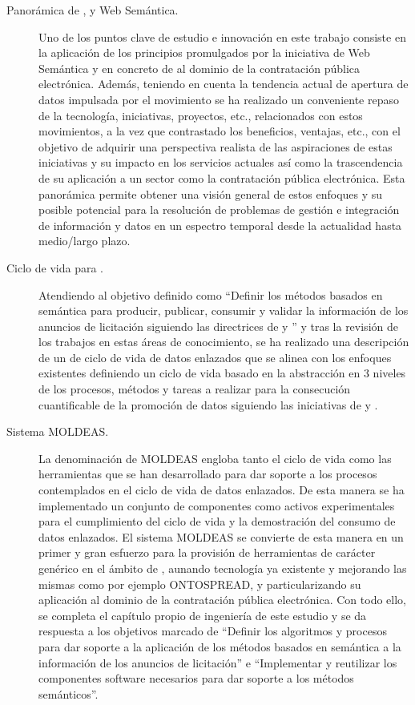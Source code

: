 \begin{description}
\item [Panorámica de \opendata, \linkeddata y Web Semántica.] Uno de los puntos clave de estudio e innovación en este trabajo 
consiste en la aplicación de los principios promulgados por la iniciativa de Web Semántica y en concreto de \linkeddata al 
dominio de la contratación pública electrónica. Además, teniendo en cuenta la tendencia actual de apertura de datos 
impulsada por el movimiento \opendata se ha realizado un conveniente repaso de la tecnología, iniciativas, proyectos, etc., 
relacionados con estos movimientos, a la vez que contrastado los beneficios, ventajas, etc., con el objetivo 
de adquirir una perspectiva realista de las aspiraciones de estas iniciativas y su impacto en los servicios actuales así 
como la trascendencia de su aplicación a un sector como la contratación pública electrónica. Esta panorámica permite 
obtener una visión general de estos enfoques y su posible potencial para la resolución de problemas de gestión e integración 
de información y datos en un espectro temporal desde la actualidad hasta medio/largo plazo.

\item [Ciclo de vida para \linkeddata.] Atendiendo al objetivo definido como ``Definir los métodos basados en semántica para producir, publicar, consumir y validar 
la información de los anuncios de licitación siguiendo las directrices de \opendata y \linkeddata'' y tras la revisión de los trabajos 
en estas áreas de conocimiento, se ha realizado una descripción de un de ciclo de vida de datos enlazados que se alinea con los enfoques 
existentes definiendo un ciclo de vida basado en la abstracción en 3 niveles de los procesos, métodos y tareas a realizar 
para la consecución cuantificable de la promoción de datos siguiendo las iniciativas de \linkeddata y \opendata.

\item [Sistema MOLDEAS.] La denominación de \gls{MOLDEAS} engloba tanto el ciclo de vida como las herramientas que se han desarrollado 
para dar soporte a los procesos contemplados en el ciclo de vida de datos enlazados. De esta manera se ha implementado un conjunto 
de componentes como activos experimentales para el cumplimiento del ciclo de vida y la demostración del consumo de datos enlazados. El 
sistema MOLDEAS se convierte de esta manera en un primer y gran esfuerzo para la provisión de herramientas de carácter genérico 
en el ámbito de \linkeddata, aunando tecnología ya existente y mejorando las mismas como por ejemplo ONTOSPREAD, y particularizando 
su aplicación al dominio de la contratación pública electrónica. Con todo ello, se completa el capítulo propio de ingeniería 
de este estudio y se da respuesta a los objetivos marcado de ``Definir los algoritmos y procesos para dar soporte a la aplicación de los métodos basados en semántica 
a la información de los anuncios de licitación'' e ``Implementar y reutilizar los componentes software necesarios para dar soporte a los métodos semánticos''.


\end{description}
